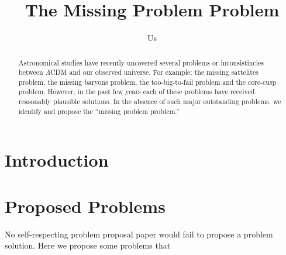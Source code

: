 \documentclass{aastex62}
\begin{document}
\title{The Missing Problem Problem}

\author{Us}

\begin{abstract}

Astronomical studies have recently uncovered several problems or
inconsistincies between $\Lambda$CDM and our observed universe. For example:
the missing sattelites problem, the missing baryons problem, the
too-big-to-fail problem and the core-cusp problem. However, in the past few
years each of these problems have received reasonably plausible solutions. In
the absence of such major outstanding problems, we identify and propose the
``missing problem problem.''

\end{abstract}


\section{Introduction} \label{sec:intro}



\section{Proposed Problems} \label{sec:prop}
No self-respecting problem proposal paper would fail to propose a problem
solution. Here we propose some problems that 
\end{document}
